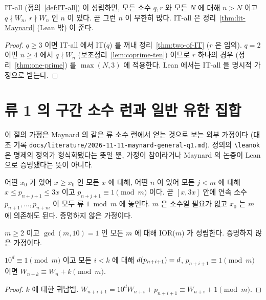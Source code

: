 \begin{corollary}[Q1, \(|S| = 2\), 문헌 조건부]
  \label{cor:Q1-two}
  \leanok
  IT-all (정의~\ref{def:IT-all}) 이 성립하면, 모든 소수 \(q, r\) 와 모든 \(N\) 에 대해
  \(n > N\) 이고 \(q \nmid W_n\), \(r \nmid W_n\) 인 \(n\) 이 있다. 곧 그런 \(n\) 이 무한히 많다.
  IT-all 은 정리~\ref{thm:lit-Maynard} (Lean 밖) 이 준다.
\end{corollary}
\begin{proof}
  \leanok
  \(q \ge 3\) 이면 IT-all 에서 IT(\(q\)) 를 꺼내 정리~\ref{thm:two-of-IT} (\(r\) 은 임의).
  \(q = 2\) 이면 \(n \ge 4\) 에서 \(q \nmid W_n\) (보조정리~\ref{lem:coprime-ten}) 이므로
  \(r\) 하나의 경우 (정리~\ref{thm:one-prime}) 를 \(\max(N, 3)\) 에 적용한다.
  Lean 에서는 IT-all 을 명시적 가정으로 받는다.
\end{proof}

\section{류 1 의 구간 소수 런과 일반 유한 집합}

이 절의 가정은 Maynard 의 같은 류 소수 런에서 얻는 것으로 보는 외부 가정이다 (대조 기록
\texttt{docs/literature/2026-11-11-maynard-general-q1.md}). 정의의 \texttt{\textbackslash leanok} 은
명제의 정의가 형식화됐다는 뜻일 뿐, 가정이 참이라거나 Maynard 의 논증이 Lean 으로 증명됐다는 뜻이 아니다.

\begin{definition}[가정 IOR(\(m\))]
  \label{def:interval-one-runs}
  \leanok
  어떤 \(x_0\) 가 있어 \(x \ge x_0\) 인 모든 \(x\) 에 대해, 어떤 \(n\) 이 있어 모든 \(j < m\) 에 대해
  \(x \le p_{n+j+1} \le 3x\) 이고 \(p_{n+j+1} \equiv 1 \pmod m\) 이다.
  곧 \([x, 3x]\) 안에 연속 소수 \(p_{n+1}, \dots, p_{n+m}\) 이 모두 류 \(1 \bmod m\) 에 놓인다.
  \(m\) 은 소수일 필요가 없고 \(x_0\) 는 \(m\) 에 의존해도 된다. 증명하지 않은 가정이다.
\end{definition}

\begin{definition}
  \label{def:interval-one-runs-all}
  \leanok
  \(m \ge 2\) 이고 \(\gcd(m, 10) = 1\) 인 모든 \(m\) 에 대해 IOR(\(m\)) 가 성립한다. 증명하지 않은 가정이다.
\end{definition}

\begin{lemma}[런 위의 합동 전이]
  \label{lem:W-add-modEq-run}
  \leanok
  \(10^d \equiv 1 \pmod m\) 이고 모든 \(i < k\) 에 대해 \(d(p_{n+i+1}) = d\), \(p_{n+i+1} \equiv 1 \pmod m\) 이면
  \(W_{n+k} \equiv W_n + k \pmod m\).
\end{lemma}
\begin{proof}
  \leanok
  \(k\) 에 대한 귀납법. \(W_{n+i+1} = 10^d W_{n+i} + p_{n+i+1} \equiv W_{n+i} + 1 \pmod m\).
\end{proof}


